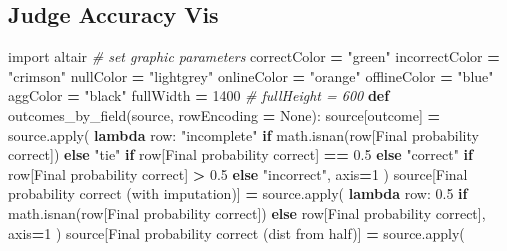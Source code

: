 \documentclass[
]{article}
\newenvironment{Shaded}{\begin{snugshade}}{\end{snugshade}}
\newcommand{\BuiltInTok}[1]{#1}
\newcommand{\CommentTok}[1]{\textcolor[rgb]{0.56,0.35,0.01}{\textit{#1}}}
\newcommand{\ControlFlowTok}[1]{\textcolor[rgb]{0.13,0.29,0.53}{\textbf{#1}}}
\newcommand{\DecValTok}[1]{\textcolor[rgb]{0.00,0.00,0.81}{#1}}
\newcommand{\FloatTok}[1]{\textcolor[rgb]{0.00,0.00,0.81}{#1}}
\newcommand{\ImportTok}[1]{#1}
\newcommand{\KeywordTok}[1]{\textcolor[rgb]{0.13,0.29,0.53}{\textbf{#1}}}
\newcommand{\NormalTok}[1]{#1}
\newcommand{\OperatorTok}[1]{\textcolor[rgb]{0.81,0.36,0.00}{\textbf{#1}}}
\newcommand{\StringTok}[1]{\textcolor[rgb]{0.31,0.60,0.02}{#1}}
\newcommand{\VariableTok}[1]{\textcolor[rgb]{0.00,0.00,0.00}{#1}}
\begin{document}
\subsection{Judge Accuracy Vis}\label{judge-accuracy-vis}

\begin{Shaded}
\begin{Highlighting}[]
\ImportTok{import}\NormalTok{ altair}
\CommentTok{\# set graphic parameters}
\NormalTok{correctColor }\OperatorTok{=} \StringTok{"green"}
\NormalTok{incorrectColor }\OperatorTok{=} \StringTok{"crimson"}
\NormalTok{nullColor }\OperatorTok{=} \StringTok{"lightgrey"}
\NormalTok{onlineColor }\OperatorTok{=} \StringTok{"orange"}
\NormalTok{offlineColor }\OperatorTok{=} \StringTok{"blue"}
\NormalTok{aggColor }\OperatorTok{=} \StringTok{"black"}
\NormalTok{fullWidth }\OperatorTok{=} \DecValTok{1400}
\CommentTok{\# fullHeight = 600}
\KeywordTok{def}\NormalTok{ outcomes\_by\_field(source, rowEncoding }\OperatorTok{=} \VariableTok{None}\NormalTok{):}
\NormalTok{    source[}\StringTok{\textquotesingle{}outcome\textquotesingle{}}\NormalTok{] }\OperatorTok{=}\NormalTok{ source.}\BuiltInTok{apply}\NormalTok{(}
        \KeywordTok{lambda}\NormalTok{ row: }\StringTok{"incomplete"} \ControlFlowTok{if}\NormalTok{ math.isnan(row[}\StringTok{\textquotesingle{}Final probability correct\textquotesingle{}}\NormalTok{])}
        \ControlFlowTok{else} \StringTok{"tie"} \ControlFlowTok{if}\NormalTok{ row[}\StringTok{\textquotesingle{}Final probability correct\textquotesingle{}}\NormalTok{] }\OperatorTok{==} \FloatTok{0.5}
        \ControlFlowTok{else} \StringTok{"correct"} \ControlFlowTok{if}\NormalTok{ row[}\StringTok{\textquotesingle{}Final probability correct\textquotesingle{}}\NormalTok{] }\OperatorTok{\textgreater{}} \FloatTok{0.5}
        \ControlFlowTok{else} \StringTok{"incorrect"}\NormalTok{,}
\NormalTok{        axis}\OperatorTok{=}\DecValTok{1}
\NormalTok{    )}
\NormalTok{    source[}\StringTok{\textquotesingle{}Final probability correct (with imputation)\textquotesingle{}}\NormalTok{] }\OperatorTok{=}\NormalTok{ source.}\BuiltInTok{apply}\NormalTok{(}
        \KeywordTok{lambda}\NormalTok{ row: }\FloatTok{0.5} \ControlFlowTok{if}\NormalTok{ math.isnan(row[}\StringTok{\textquotesingle{}Final probability correct\textquotesingle{}}\NormalTok{])}
        \ControlFlowTok{else}\NormalTok{ row[}\StringTok{\textquotesingle{}Final probability correct\textquotesingle{}}\NormalTok{],}
\NormalTok{        axis}\OperatorTok{=}\DecValTok{1}
\NormalTok{    )}
\NormalTok{    source[}\StringTok{\textquotesingle{}Final probability correct (dist from half)\textquotesingle{}}\NormalTok{] }\OperatorTok{=}\NormalTok{ source.}\BuiltInTok{apply}\NormalTok{(}

\end{Highlighting}
\end{Shaded}
\end{document}
